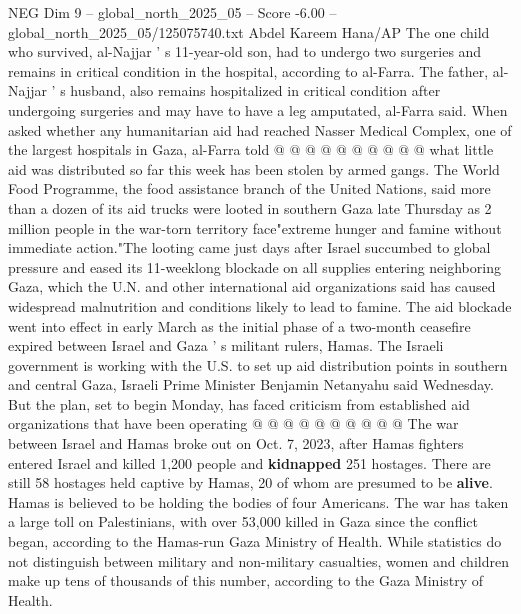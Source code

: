 \begin{textsample}{NEG Dim 9 – global\_north\_2025\_05 – Score -6.00 – global\_north\_2025\_05/125075740.txt}
Abdel Kareem Hana/AP The one child who survived, al-Najjar ' s 11-year-old son, had to undergo two surgeries and remains in critical condition in the hospital, according to al-Farra.
The father, al-Najjar ' s husband, also remains hospitalized in critical condition after undergoing surgeries and may have to have a leg amputated, al-Farra said.
When asked whether any humanitarian aid had reached Nasser Medical Complex, one of the largest hospitals in Gaza, al-Farra told @ @ @ @ @ @ @ @ @ @ what little aid was distributed so far this week has been stolen by armed gangs.
The World Food Programme, the food assistance branch of the United Nations, said more than a dozen of its aid trucks were looted in southern Gaza late Thursday as 2 million people in the war-torn territory face"extreme hunger and famine without immediate action."The looting came just days after Israel succumbed to global pressure and eased its 11-weeklong blockade on all supplies entering neighboring Gaza, which the U.N. and other international aid organizations said has caused widespread malnutrition and conditions likely to lead to famine.
The aid blockade went into effect in early March as the initial phase of a two-month ceasefire expired between Israel and Gaza ' s militant rulers, Hamas.
The Israeli government is working with the U.S. to set up aid distribution points in southern and central Gaza, Israeli Prime Minister Benjamin Netanyahu said Wednesday.
But the plan, set to begin Monday, has faced criticism from established aid organizations that have been operating @ @ @ @ @ @ @ @ @ @ The war between Israel and Hamas broke out on Oct. 7, 2023, after Hamas fighters entered Israel and killed 1,200 people and \textbf{kidnapped} 251 hostages.
There are still 58 hostages held captive by Hamas, 20 of whom are presumed to be \textbf{alive}.
Hamas is believed to be holding the bodies of four Americans.
The war has taken a large toll on Palestinians, with over 53,000 killed in Gaza since the conflict began, according to the Hamas-run Gaza Ministry of Health.
While statistics do not distinguish between military and non-military casualties, women and children make up tens of thousands of this number, according to the Gaza Ministry of Health.

\end{textsample}
